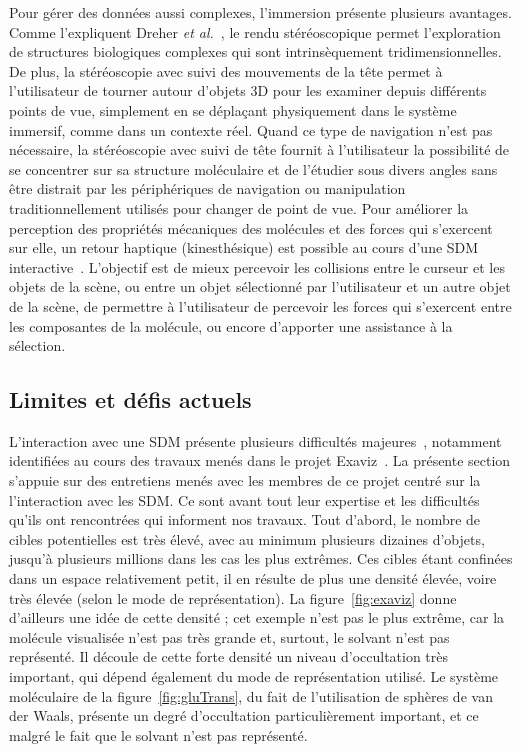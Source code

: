 	Pour gérer des données aussi complexes, l'immersion présente plusieurs avantages. Comme l'expliquent Dreher \emph{et al.}~\cite{dreher2014exaviz}, le rendu stéréoscopique\footnotemark{} permet l'exploration de structures biologiques complexes qui sont intrinsèquement tridimensionnelles. De plus, la stéréoscopie avec suivi des mouvements de la tête permet à l'utilisateur de tourner autour d'objets 3D pour les examiner depuis différents points de vue, simplement en se déplaçant physiquement dans le système immersif, comme dans un contexte réel. Quand ce type de navigation n'est pas nécessaire, la stéréoscopie avec suivi de tête fournit à l'utilisateur la possibilité de se concentrer sur sa structure moléculaire et de l'étudier sous divers angles sans être distrait par les périphériques de navigation ou manipulation traditionnellement utilisés pour changer de point de vue. Pour améliorer la perception des propriétés mécaniques des molécules et des forces qui s'exercent sur elle, un retour haptique (kinesthésique) est possible au cours d'une SDM interactive~\cite{stone2001system}. L'objectif est de mieux percevoir les \og collisions \fg{} entre le curseur et les objets de la scène, ou entre un objet sélectionné par l'utilisateur et un autre objet de la scène, de permettre à l'utilisateur de percevoir les forces qui s'exercent entre les composantes de la molécule, ou encore d'apporter une assistance à la sélection.
	
	
	\subsection{Limites et défis actuels}
	L'interaction avec une SDM présente plusieurs difficultés majeures~\cite{kouyoumdjian2014understanding, kouyoumdjian2015mdinvr}, notamment identifiées au cours des travaux menés dans le projet Exaviz~\cite{dreher2014exaviz}. La présente section s'appuie sur des entretiens menés avec les membres de ce projet centré sur la l'interaction avec les SDM. Ce sont avant tout leur expertise et les difficultés qu'ils ont rencontrées qui informent nos travaux. Tout d'abord, le nombre de cibles potentielles est très élevé, avec au minimum plusieurs dizaines d'objets, jusqu'à plusieurs millions dans les cas les plus extrêmes. Ces cibles étant confinées dans un espace relativement petit, il en résulte de plus une densité élevée, voire très élevée (selon le mode de représentation). La figure~\ref{fig:exaviz} donne d'ailleurs une idée de cette densité ; cet exemple n'est pas le plus extrême, car la molécule visualisée n'est pas très grande et, surtout, le solvant n'est pas représenté. Il découle de cette forte densité un niveau d'occultation très important, qui dépend également du mode de représentation utilisé. Le système moléculaire de la figure~\ref{fig:gluTrans}, du fait de l'utilisation de sphères de van der Waals, présente un degré d'occultation particulièrement important, et ce malgré le fait que le solvant n'est pas représenté.
	
